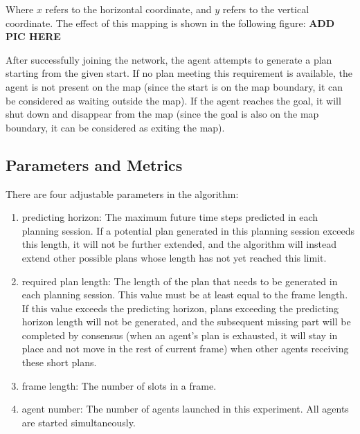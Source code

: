 Where $x$ refers to the horizontal coordinate, and $y$ refers to the vertical coordinate.
The effect of this mapping is shown in the following figure:
\textbf{ADD PIC HERE} %

After successfully joining the network, the agent attempts to generate a plan starting from the given start. If no plan meeting this requirement is available, the agent is not present on the map (since the start is on the map boundary, it can be considered as waiting outside the map).
If the agent reaches the goal, it will shut down and disappear from the map (since the goal is also on the map boundary, it can be considered as exiting the map).

\subsection*{Parameters and Metrics}
There are four adjustable parameters in the algorithm: 
\begin{enumerate}
    \item predicting horizon: The maximum future time steps predicted in each planning session. If a potential plan generated in this planning session exceeds this length, it will not be further extended, and the algorithm will instead extend other possible plans whose length has not yet reached this limit.
    \item required plan length: The length of the plan that needs to be generated in each planning session. This value must be at least equal to the frame length. If this value exceeds the predicting horizon, plans exceeding the predicting horizon length will not be generated, and the subsequent missing part will be completed by consensus (when an agent's plan is exhausted, it will stay in place and not move in the rest of current frame) when other agents receiving these short plans.
    \item frame length: The number of slots in a frame.
    \item agent number: The number of agents launched in this experiment. All agents are started simultaneously.
\end{enumerate}

